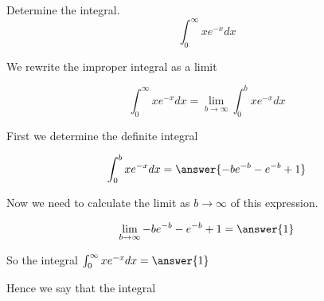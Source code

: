 \documentclass{ximera}
\author{Jason Miller}
\begin{document}
\begin{exercise}
Determine the integral.
\[
\int_{0}^{\infty} xe^{-x} dx
\]


We rewrite the improper integral as a limit 

\[
\int_{0}^{\infty} xe^{-x} dx= \lim_{b \to \infty} \int_{0}^{b} xe^{-x} dx
\]


First we determine the definite integral

\[
\int_{0}^{b} xe^{-x} dx=\answer{ -be^{-b}-e^{-b} +1 } 
\]




\begin{exercise}
Now we need to calculate the limit as $b \to \infty$ of this expression. 

\[
\lim_{b \to \infty}  -be^{-b}-e^{-b} +1 =\answer{ 1}
\]

\begin{exercise}
So the  integral $\int_{0}^{\infty} xe^{-x} dx=\answer{1}$

\begin{exercise}
 Hence we say that the integral 

\begin{multipleChoice}
\end{multipleChoice}



\end{exercise}
\end{exercise}
\end{exercise}
\end{exercise}
\end{document}
